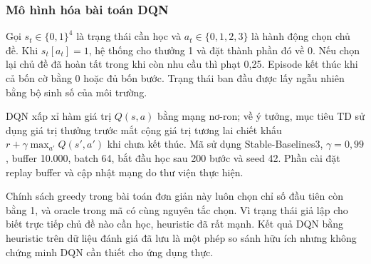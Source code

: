 \subsubsection{Mô hình hóa bài toán DQN}
Gọi $s_t\in\{0,1\}^{4}$ là trạng thái cần học và $a_t\in\{0,1,2,3\}$ là hành động chọn chủ đề. Khi $s_t[a_t]=1$, hệ thống cho thưởng 1 và đặt thành phần đó về 0. Nếu chọn lại chủ đề đã hoàn tất trong khi còn nhu cầu thì phạt 0,25. Episode kết thúc khi cả bốn cờ bằng 0 hoặc đủ bốn bước. Trạng thái ban đầu được lấy ngẫu nhiên bằng bộ sinh số của môi trường.

DQN xấp xỉ hàm giá trị $Q(s,a)$ bằng mạng nơ-ron; về ý tưởng, mục tiêu TD sử dụng giá trị thưởng trước mắt cộng giá trị tương lai chiết khấu $r+\gamma\max_{a'}Q(s',a')$ khi chưa kết thúc. Mã sử dụng Stable-Baselines3, $\gamma=0,99$, buffer 10.000, batch 64, bắt đầu học sau 200 bước và seed 42. Phần cài đặt replay buffer và cập nhật mạng do thư viện thực hiện.

Chính sách greedy trong bài toán đơn giản này luôn chọn chỉ số đầu tiên còn bằng 1, và oracle trong mã có cùng nguyên tắc chọn. Vì trạng thái giả lập cho biết trực tiếp chủ đề nào cần học, heuristic đã rất mạnh. Kết quả DQN bằng heuristic trên dữ liệu đánh giá đã lưu là một phép so sánh hữu ích nhưng không chứng minh DQN cần thiết cho ứng dụng thực.

